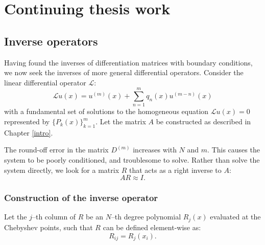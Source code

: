 \documentclass{book}
\begin{document}
\chapter{Continuing thesis work}

\newcommand{\W}[2]{W \left ( #1 ; #2 \right )}
\newcommand{\poly}[1]{\frac{x^{#1}}{(#1)!}}
\newcommand{\Poly}[1]{\frac{x^#1}{#1!}}

\section{Inverse operators}

Having found the inverses of differentiation matrices with boundary conditions, we now seek the inverses of more general differential operators.
Consider the linear differential operator $\mathcal{L}$:
\begin{equation}
\mathcal{L} u(x) = u^{(m)}(x) + \sum_{n = 1}^m q_n(x) u^{(m-n)}(x)
\end{equation}
with a fundamental set of solutions to the homogeneous equation $\mathcal{L} u(x) = 0$ represented by $\{ P_k(x) \}_{k=1}^m$.
Let the matrix $A$ be constructed as described in Chapter \ref{intro}.

The round-off error in the matrix $D^{(m)}$ increases with $N$ and $m$.
This causes the system to be poorly conditioned, and troublesome to solve.
Rather than solve the system directly, we look for a matrix $R$ that acts as a right inverse to $A$:
\begin{equation}
A R \approx I.
\end{equation}

\subsection{Construction of the inverse operator}

Let the $j$--th column of $R$ be an $N$--th degree polynomial $R_j(x)$ evaluated at the Chebyshev points, such that $R$ can be defined element-wise as:
\begin{equation}
R_{ij} = R_j(x_i) .
\end{equation}
\end{document}
